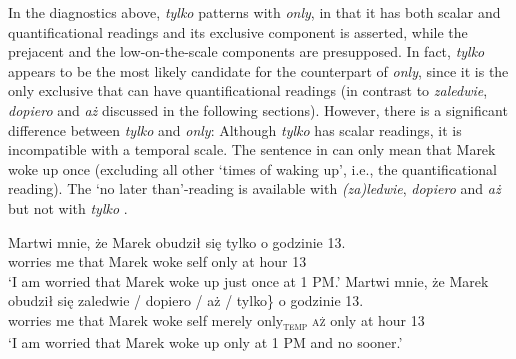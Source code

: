 \documentclass[output=paper,colorlinks,citecolor=brown]{langscibook}
\begin{document}
\ea\label{ex:tom:31}
\begin{xlist}
\end{xlist}
\z 


\noindent In the diagnostics above, \textit{tylko} patterns with \textit{only}, in that it has both scalar and quantificational readings and its exclusive component is asserted, while the prejacent and the low-on-the-scale components are presupposed. In fact, \textit{tylko} appears to be the most likely candidate for the counterpart of \textit{only}, since it is the only exclusive that can have quantificational readings (in contrast to \textit{zaledwie}, \textit{dopiero} and \textit{aż} discussed in the following sections). However, there is a significant difference between \textit{tylko} and \textit{only}: Although \textit{tylko} has scalar readings, it is incompatible with a temporal scale. The sentence in  can only mean that Marek woke up once (excluding all other ‘times of waking up’, i.e., the quantificational reading). The `no later than'-reading is available with \textit{(za)ledwie}, \textit{dopiero} and \textit{aż} but not with \textit{tylko} .

\ea\label{ex:tom:32}
\ea\label{ex:tom:32a}      
\gll Martwi mnie, że Marek obudził się tylko o godzinie 13.\\
worries me that Marek woke self only at hour 13\\
\glt `I am worried that Marek woke up just once at 1 PM.’
\ex\label{ex:tom:32b}
\gll Martwi mnie, że Marek obudził się \minsp{\{} zaledwie / dopiero / aż /\hspace{.8cm} \minsp{\#} tylko\} o godzinie 13.\\
worries me that Marek woke self {} merely {} only\textsubscript{\textsc{temp}} {} \textsc{aż} {} {} only at hour 13\\
\glt `I am worried that Marek woke up only at 1 PM and no sooner.’
\z 
\z 
\end{document}
